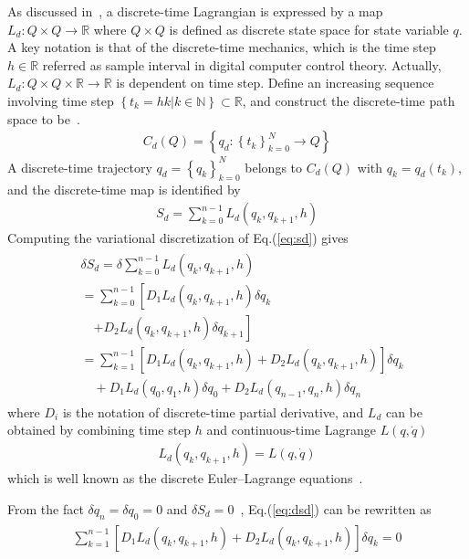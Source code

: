 \documentclass[10pt,final,journal]{IEEEtran}
\begin{document}
As discussed in~\cite{Marsden2001Discrete}, a discrete-time Lagrangian is expressed by a map $L_d:Q\times Q\to \mathbb R$ where $Q\times Q$ is defined as discrete state space for state variable $q$. A key notation is that of the discrete-time mechanics, which is the time step $h\in \mathbb R$ referred as sample interval in digital computer control theory. Actually, $L_d:Q\times Q\times\mathbb R\to \mathbb R$ is dependent on time step. Define an increasing sequence involving time step $\left\{t_k=hk\left\vert k\in\mathbb N\right.\right\}\subset \mathbb R$, and construct the discrete-time path space to be~\cite{Marsden2001Discrete}.
\begin{align}
	C_d(Q)=\left\{q_d:\left\{t_k\right\}^N_{k=0}\to Q\right\}
\end{align}
A discrete-time trajectory $q_d=\left\{q_k\right\}^N_{k=0}$ belongs to $C_d(Q)$ with $q_k=q_d(t_k)$, and the discrete-time map is identified by
\begin{align}\label{eq:sd}
	S_d=\sum^{n-1}_{k=0}L_d(q_k,q_{k+1},h)
\end{align}
Computing the variational discretization of Eq.(\ref{eq:sd}) gives
\begin{align}\begin{split}\label{eq:dsd}
	&\delta S_d=\delta\sum^{n-1}_{k=0}L_d(q_k,q_{k+1},h)\\
	&=\sum^{n-1}_{k=0}\left[D_1L_d(q_k,q_{k+1},h)\delta q_k\right.\\
	&\quad\left.+D_2L_d(q_k,q_{k+1},h)\delta q_{k+1}\right]\\
	&=\sum^{n-1}_{k=1}\left[D_1L_d(q_k,q_{k+1},h)+D_2L_d(q_k,q_{k+1},h)\right]\delta q_{k}\\
		&\quad+D_1L_d(q_0,q_{1},h)\delta q_0+D_2L_d(q_{n-1},q_{n},h)\delta q_n
\end{split}\end{align}
where $D_{i}$ is the notation of discrete-time partial derivative, and $L_d$ can be obtained by combining time step $h$ and continuous-time Lagrange $L(q,\dot q)$~\cite{Marsden2001Discrete}
\begin{align}
	L_d(q_k,q_{k+1},h)=L(q,\dot q)
\end{align}
which is well known as the discrete Euler–Lagrange equations~\cite{Bloch2005Controlled}.

From the fact $\delta q_n=\delta q_0=0$ and $\delta S_d=0$~\cite{Marsden2001Discrete}, Eq.(\ref{eq:dsd}) can be rewritten as
\begin{align}\begin{split}
        \sum^{n-1}_{k=1}\left[D_1L_d(q_k,q_{k+1},h)+D_2L_d(q_k,q_{k+1},h)\right]\delta q_{k}=0
\end{split}\end{align} 
\end{document}
